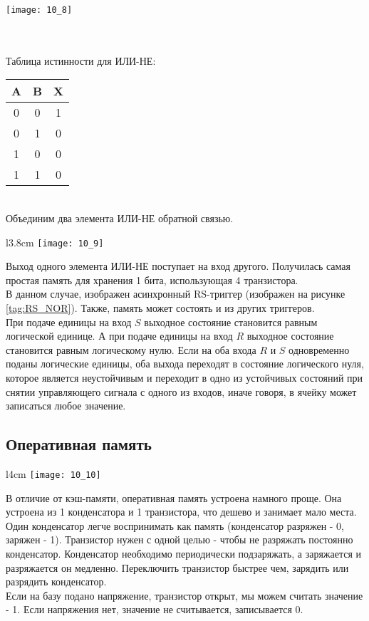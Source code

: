 \begin{minipage}[l]{4cm}
\texttt{[image: 10\_8]}
\end{minipage}
\\
\\Таблица истинности для ИЛИ-НЕ:
\begin{table}[!h]
\begin{tabular}{|c|c|c|}
\hline
A & B & X \\
\hline
 0 & 0 & 1 \\
 0 & 1 & 0 \\
 1 & 0 & 0 \\
 1 & 1 & 0 \\
\hline
\end{tabular}
\end{table}
\\Объединим два элемента ИЛИ-НЕ обратной связью.
\begin{wrapfigure}[10]{l}{3.8cm}
\texttt{[image: 10\_9]}
\end{wrapfigure}
Выход одного элемента ИЛИ-НЕ поступает на вход другого. Получилась самая простая память для хранения 1 бита, использующая 4 транзистора.
\\В данном случае, изображен асинхронный RS-триггер (изображен на рисунке \ref{tag:RS_NOR}). Также, память может состоять и из других триггеров.
\\При подаче единицы на вход $S$ выходное состояние становится равным логической единице. А при подаче единицы на вход $R$ выходное состояние становится равным логическому нулю. Если на оба входа $R$ и $S$ одновременно поданы логические единицы, оба выхода переходят в состояние логического нуля, которое является неустойчивым и переходит в одно из устойчивых состояний при снятии управляющего сигнала с одного из входов, иначе говоря, в ячейку может записаться любое значение.
\subsection{Оперативная память}
\begin{wrapfigure}[10]{l}{4cm}
\texttt{[image: 10\_10]}
\end{wrapfigure}
В отличие от кэш-памяти, оперативная память устроена намного проще. Она устроена из 1 конденсатора и 1 транзистора, что дешево и занимает мало места. Один конденсатор легче воспринимать как память (конденсатор разряжен - 0, заряжен - 1). Транзистор нужен с одной целью - чтобы не разряжать постоянно конденсатор. Конденсатор необходимо периодически подзаряжать, а заряжается и разряжается он медленно. Переключить транзистор быстрее чем, зарядить или разрядить конденсатор.
\\Если на базу подано напряжение, транзистор открыт, мы можем считать значение - 1. Если напряжения нет, значение не считывается, записывается 0.
